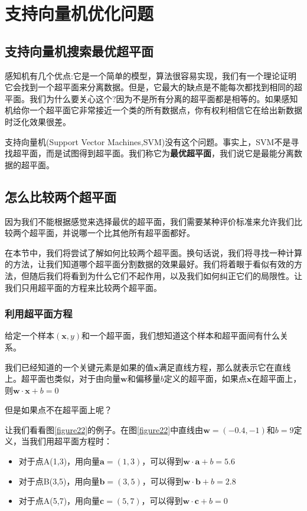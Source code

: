\chapter{支持向量机优化问题}

\section{支持向量机搜索最优超平面}

感知机有几个优点:它是一个简单的模型，算法很容易实现，我们有一个理论证明它会找到一个超平面来分离数据。但是，它最大的缺点是不能每次都找到相同的超平面。我们为什么要关心这个?因为不是所有分离的超平面都是相等的。如果感知机给你一个超平面它非常接近一个类的所有数据点，你有权利相信它在给出新数据时泛化效果很差。

支持向量机(Support Vector Machines,SVM)没有这个问题。事实上，SVM不是寻找超平面，而是试图得到超平面。我们称它为\textbf{最优超平面}，我们说它是最能分离数据的超平面。

\section{怎么比较两个超平面}
因为我们不能根据感觉来选择最优的超平面，我们需要某种评价标准来允许我们比较两个超平面，并说哪一个比其他所有超平面都好。

在本节中，我们将尝试了解如何比较两个超平面。换句话说，我们将寻找一种计算的方法，让我们知道哪个超平面分割数据的效果最好。我们将着眼于看似有效的方法，但随后我们将看到为什么它们不起作用，以及我们如何纠正它们的局限性。让我们只用超平面的方程来比较两个超平面。

\subsection{利用超平面方程}

给定一个样本$(\mathbf{x},y)$和一个超平面，我们想知道这个样本和超平面间有什么关系。

我们已经知道的一个关键元素是如果的值$\mathbf{x}$满足直线方程，那么就表示它在直线上。超平面也类似，对于由向量$\mathbf{w}$和偏移量$b$定义的超平面，如果点$\mathbf{x}$在超平面上，则$\mathbf{w} \cdot \mathbf{x} + b = 0$

但是如果点不在超平面上呢？

让我们看看图\ref{figure22}的例子。在图\ref{figure22}中直线由$\mathbf{w}=(-0.4,-1)$和$b=9$定义，当我们用超平面方程时：
\begin{itemize}
    \item 对于点A(1,3)，用向量$\mathbf{a}=(1,3)$，可以得到$\mathbf{w}\cdot\mathbf{a}+b=5.6$
    \item 对于点B(3,5)，用向量$\mathbf{b}=(3,5)$，可以得到$\mathbf{w}\cdot\mathbf{b}+b=2.8$
    \item 对于点A(5,7)，用向量$\mathbf{c}=(5,7)$，可以得到$\mathbf{w}\cdot\mathbf{c}+b=0$
\end{itemize}


